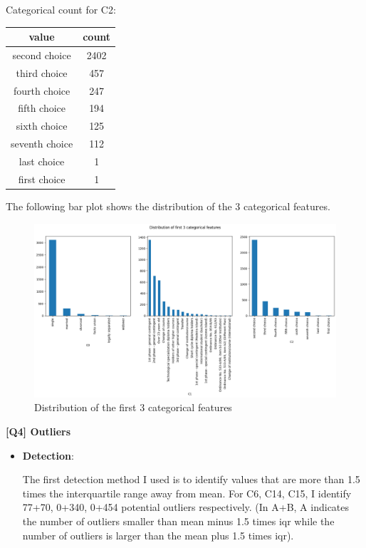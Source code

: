 \documentclass{article}
\begin{document}
\begin{description}
\begin{itemize}
				Categorical count for C2:
				\begin{center}
					\begin{tabular}{|c|c|}
						\hline
						value & count \\
						\hline
						second choice     &2402 \\
						third choice      & 457 \\
						fourth choice     & 247 \\
						fifth choice      & 194 \\
						sixth choice      & 125 \\
						seventh choice    & 112 \\
						last choice       &   1 \\
						first choice      &   1 \\
						\hline
					\end{tabular}
				\end{center}
		\end{itemize}

		The following bar plot shows the distribution of the 3 categorical features.

		\begin{figure}[H]
			\centering
			\includegraphics[width=\textwidth]{figures/q3_categorical_distribution.png}
			\caption{Distribution of the first 3 categorical features}
			\label{}
		\end{figure}

	\item \textbf{[Q4] Outliers}
		\begin{itemize}
			\item \textbf{Detection}: 

				The first detection method I used is to identify values that are more than 1.5 times the interquartile range away from mean. For C6, C14, C15, I identify 77+70, 0+340, 0+454 potential outliers respectively. (In A+B, A indicates the number of outliers smaller than mean minus 1.5 times iqr while the number of outliers is larger than the mean plus 1.5 times iqr).


\end{itemize}
\end{description}
\end{document}
